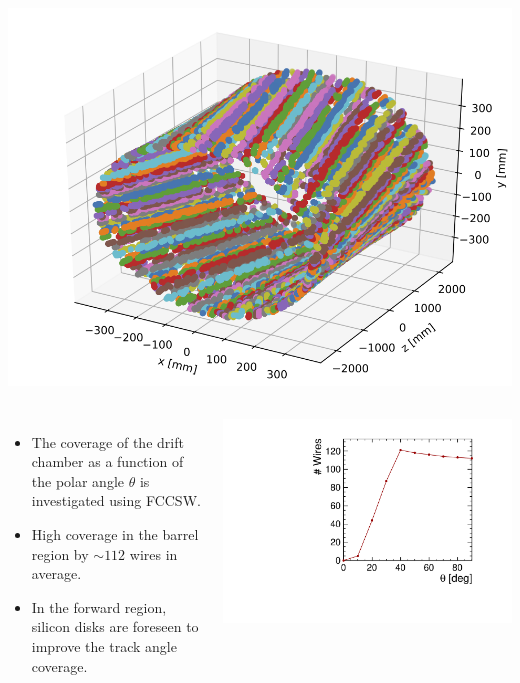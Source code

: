 \documentclass[final,xcolor={dvipsnames,svgnames,x11names,table}]{beamer}
\begin{document}
\begin{frame}
\begin{textblock}{39.5}
\begin{tcolorbox}[title=The simulation of the drift chamber with FCCSW]
\begin{columns}
        \centering
        \includegraphics[width=\textwidth]{Figures/allHits}

    \end{columns}


    \begin{columns}
      \begin{itemize}
        \item The coverage of the drift chamber as a function of the polar angle $\theta$ is investigated using FCCSW. \vspace{0.5cm}
        \item High coverage in the barrel region by $\sim 112$ wires in average. \vspace{0.5cm}
        \item In the forward region, silicon disks are foreseen to improve the track angle coverage. \vspace{0.5cm}
      \end{itemize}

        \centering
        \includegraphics[width=\textwidth]{Figures/numWires}
    \end{columns}


\end{tcolorbox}
\end{textblock}
\end{frame}
\end{document}
